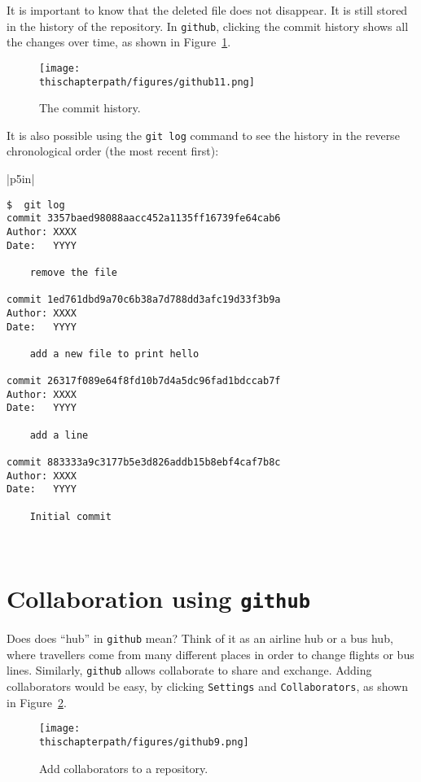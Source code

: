 It is important to know that the deleted file does not disappear. It is still
stored in the history of the repository. In {\tt github}, clicking the commit
history shows all the changes over time, as shown in Figure~\ref{fig:github11}.

\begin{figure}[h] \centering
{\texttt{[image: \\thischapterpath/figures/github11.png]}}
\caption{The commit history.}
\label{fig:github11}
\end{figure}

It is also possible using the {\tt git log} command to see the history in
the reverse chronological order (the most recent first):

\vspace{0.2in}
\noindent
\begin{tabular}{|p{5in}|}\hline
\begin{verbatim}
$  git log
commit 3357baed98088aacc452a1135ff16739fe64cab6
Author: XXXX
Date:   YYYY

    remove the file

commit 1ed761dbd9a70c6b38a7d788dd3afc19d33f3b9a
Author: XXXX
Date:   YYYY

    add a new file to print hello

commit 26317f089e64f8fd10b7d4a5dc96fad1bdccab7f
Author: XXXX
Date:   YYYY

    add a line

commit 883333a9c3177b5e3d826addb15b8ebf4caf7b8c
Author: XXXX
Date:   YYYY

    Initial commit
\end{verbatim}
\\ \hline
\end{tabular}
\vspace{0.2in}


\section{Collaboration using {\tt github}}

Does does ``hub'' in {\tt github} mean? Think of it as an airline hub
or a bus hub, where travellers come from many different places in
order to change flights or bus lines.  Similarly, {\tt github} allows
collaborate to share and exchange.  Adding collaborators would be
easy, by clicking {\tt Settings} and {\tt Collaborators}, as shown
in Figure~\ref{fig:github9}.


\begin{figure}[h] \centering
{\texttt{[image: \\thischapterpath/figures/github9.png]}}
\caption{Add collaborators to a repository.}
\label{fig:github9}
\end{figure}

